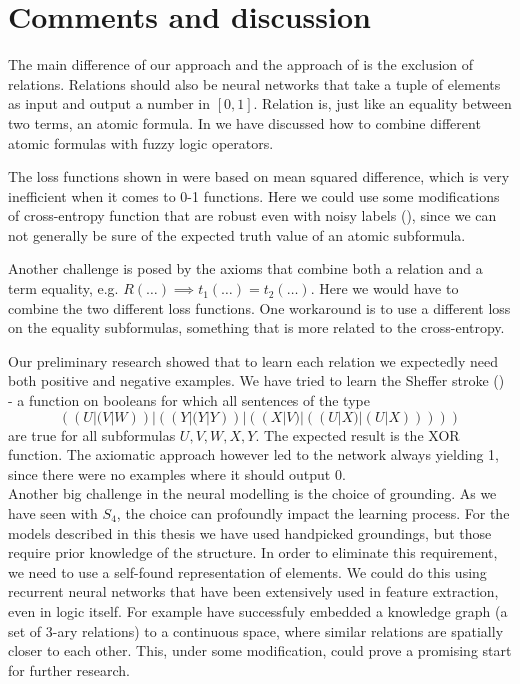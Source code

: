 \chapter{Comments and discussion}
\label{comments}
The main difference of our approach and the approach of \cite{serafini} is the exclusion of relations. Relations should also be neural networks that take a tuple of elements as input and output a number in $[0,1]$. Relation is, just like an equality between two terms, an atomic formula. In  we have discussed how to combine different atomic formulas with fuzzy logic operators.

The loss functions shown in  were based on mean squared difference, which is very inefficient when it comes to 0-1 functions. Here we could use some modifications of cross-entropy function that are robust even with noisy labels (\cite{crossentropy}), since we can not generally be sure of the expected truth value of an atomic subformula. 

Another challenge is posed by the axioms that combine both a relation and a term equality, e.g. $R(\dots)\implies t_1(\dots)=t_2(\dots)$. Here we would have to combine the two different loss functions. One workaround is to use a different loss on the equality subformulas, something that is more related to the cross-entropy.

Our preliminary research showed that to learn each relation we expectedly need both positive and negative examples. We have tried to learn the Sheffer stroke (\cite{sheffer}) - a function on booleans for which all sentences of the type $$((U|(V|W))|((Y|(Y|Y))|((X|V)|((U|X)|(U|X)))))$$ are true for all subformulas $U,V,W,X,Y$. The expected result is the XOR function. The axiomatic approach however led to the network always yielding 1, since there were no examples where it should output 0.\\

Another big challenge in the neural modelling is the choice of grounding. As we have seen with $S_4$, the choice can profoundly impact the learning process. For the models described in this thesis we have used handpicked groundings, but those require prior knowledge of the structure. In order to eliminate this requirement, we need to use a self-found representation of elements. We could do this using recurrent neural networks that have been extensively used in feature extraction, even in logic itself. For example \cite{grounding_wang} have successfuly embedded a knowledge graph (a set of 3-ary relations) to a continuous space, where similar relations are spatially closer to each other. This, under some modification, could prove a promising start for further research.\\

